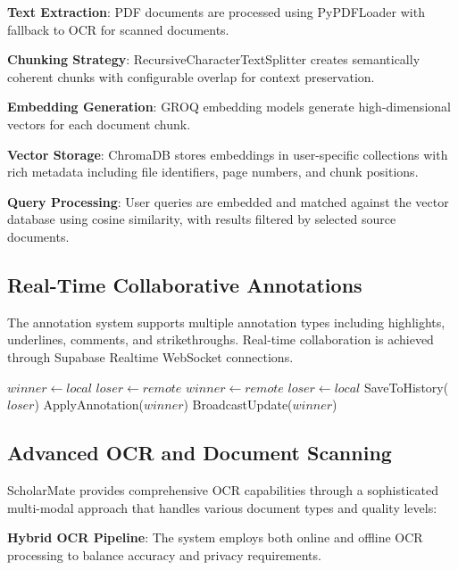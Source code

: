 \documentclass[conference]{IEEEtran}
\begin{document}
\textbf{Text Extraction}: PDF documents are processed using PyPDFLoader with fallback to OCR for scanned documents.

\textbf{Chunking Strategy}: RecursiveCharacterTextSplitter creates semantically coherent chunks with configurable overlap for context preservation.

\textbf{Embedding Generation}: GROQ embedding models generate high-dimensional vectors for each document chunk.

\textbf{Vector Storage}: ChromaDB stores embeddings in user-specific collections with rich metadata including file identifiers, page numbers, and chunk positions.

\textbf{Query Processing}: User queries are embedded and matched against the vector database using cosine similarity, with results filtered by selected source documents.

\subsection{Real-Time Collaborative Annotations}

The annotation system supports multiple annotation types including highlights, underlines, comments, and strikethroughs. Real-time collaboration is achieved through Supabase Realtime WebSocket connections.

\begin{algorithm}[htbp]
\caption{Annotation Conflict Resolution}
\begin{algorithmic}[1]
        \State $winner \gets local$
        \State $loser \gets remote$
    \Else
        \State $winner \gets remote$
        \State $loser \gets local$
    \EndIf
    \State SaveToHistory($loser$)
    \State ApplyAnnotation($winner$)
    \State BroadcastUpdate($winner$)
\EndProcedure
\end{algorithmic}
\end{algorithm}

\subsection{Advanced OCR and Document Scanning}

ScholarMate provides comprehensive OCR capabilities through a sophisticated multi-modal approach that handles various document types and quality levels:

\textbf{Hybrid OCR Pipeline}: The system employs both online and offline OCR processing to balance accuracy and privacy requirements.
\end{document}
